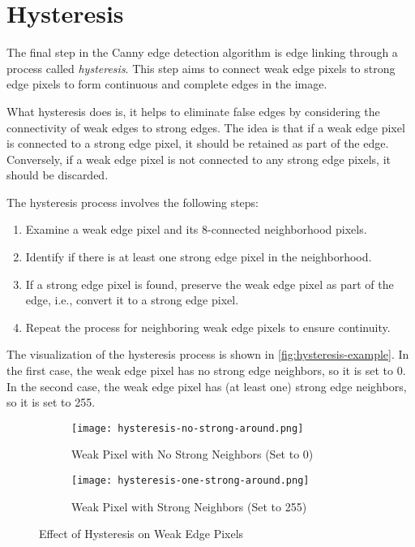 \section{Hysteresis}
\label{sec:hysteresis}

The final step in the Canny edge detection algorithm is edge linking through a process called \emph{hysteresis}. This step aims to connect weak edge pixels to strong edge pixels to form continuous and complete edges in the image.

What hysteresis does is, it helps to eliminate false edges by considering the connectivity of weak edges to strong edges. The idea is that if a weak edge pixel is connected to a strong edge pixel, it should be retained as part of the edge. Conversely, if a weak edge pixel is not connected to any strong edge pixels, it should be discarded.

The hysteresis process involves the following steps:

\begin{enumerate}
    \item Examine a weak edge pixel and its 8-connected neighborhood pixels.
    \item Identify if there is at least one strong edge pixel in the neighborhood.
    \item If a strong edge pixel is found, preserve the weak edge pixel as part of the edge, i.e., convert it to a strong edge pixel.
    \item Repeat the process for neighboring weak edge pixels to ensure continuity.
\end{enumerate}

The visualization of the hysteresis process is shown in \autoref{fig:hysteresis-example}. In the first case, the weak edge pixel has no strong edge neighbors, so it is set to 0. In the second case, the weak edge pixel has (at least one) strong edge neighbors, so it is set to 255.

\begin{figure}[ht]
    \centering
    \begin{subfigure}[b]{0.4\textwidth}
        \centering
        \texttt{[image: hysteresis-no-strong-around.png]}
        \caption{Weak Pixel with No Strong Neighbors (Set to 0)}
        \label{fig:hysteresis-no-strong-around}
    \end{subfigure}
    \hfill
    \begin{subfigure}[b]{0.4\textwidth}
        \centering
        \texttt{[image: hysteresis-one-strong-around.png]}
        \caption{Weak Pixel with Strong Neighbors (Set to 255)}
        \label{fig:hysteresis-one-strong-around}
    \end{subfigure}
    \caption{Effect of Hysteresis on Weak Edge Pixels}
    \label{fig:hysteresis-example}
\end{figure}

